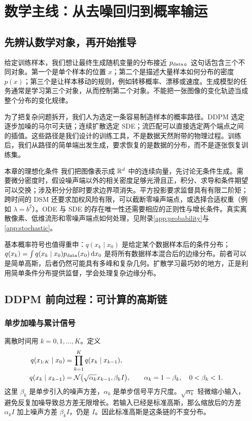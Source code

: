\chapter{数学主线：从去噪回归到概率输运}\label{ch:math}

\section{先辨认数学对象，再开始推导}
给定训练样本，我们想让最终生成随机变量的分布接近 $p_{\mathrm{data}}$。这句话包含三个不同对象。第一个是单个样本的位置 $x$；第二个是描述大量样本如何分布的密度 $p(x)$；第三个是让样本移动的规则，例如转移概率、漂移或速度。生成模型的任务通常是学习第三个对象，从而控制第二个对象。不能把一张图像的变化轨迹当成整个分布的变化规律。

为了把复杂问题拆开，我们人为选定一条容易制造样本的概率路径。DDPM 选定逐步加噪的马尔可夫链；连续扩散选定 SDE；流匹配可以直接选定两个端点之间的插值。这些路径是我们设计的训练工具，不是数据天然附带的物理过程。训练后，我们从路径的简单端出发生成，要求恢复的是数据的分布，而不是逐张恢复训练集。

\begin{keybox}{本章的理想化条件}
我们把图像表示成 $\mathbb{R}^d$ 中的连续向量，先讨论无条件生成。需要微分密度时，假设噪声端以外的相关密度足够光滑且正，积分、求导和条件期望可以交换；涉及积分分部时要求边界项消失。平方投影要求监督具有有限二阶矩；跨时间的 DSM 还要求加权风险有限，可以截断零噪声端点，或选择合适权重（例如 $\lambda=b^2$）。ODE 与 SDE 的存在唯一性还需要相应的正则性与增长条件。真实离散像素、低维流形和零噪声端点如何处理，见附录\ref{app:probability}与\ref{app:stochastic}。
\end{keybox}

基本概率符号也值得重申：$q(x_k\mid x_0)$ 是给定某个数据样本后的条件分布；$q(x_k)=\int q(x_k\mid x_0)p_{\mathrm{data}}(x_0)\mathop{}\!\mathrm{d} x_0$ 是将所有数据样本混合后的边缘分布。前者可以是简单高斯，后者仍然可能具有多峰和复杂几何。扩散学习最巧妙的地方，正是利用简单条件分布提供监督，学会处理复杂边缘分布。

\section{DDPM 前向过程：可计算的高斯链}\label{sec:ddpm-forward}
\subsection{单步加噪与累计信号}
离散时间用 $k=0,1,\ldots,K$。定义
\begin{align}
 q(x_{1:K}\mid x_0)&=\prod_{k=1}^Kq(x_k\mid x_{k-1}),\\
 q(x_k\mid x_{k-1})&=\mathcal{N}\bigl(\sqrt{\alpha_k}x_{k-1},\beta_kI\bigr),\qquad
 \alpha_k=1-\beta_k,\quad 0<\beta_k<1.
\end{align}
这里 $\beta_k$ 是单步引入的噪声方差，$\alpha_k$ 是单步信号平方尺度。$\sqrt{\alpha_k}$ 轻微缩小输入，避免反复加噪导致总方差无限增长。若输入已经是标准高斯，那么缩放后的方差 $\alpha_kI$ 加上噪声方差 $\beta_kI$，仍是 $I$。因此标准高斯是这条链的不变分布。

